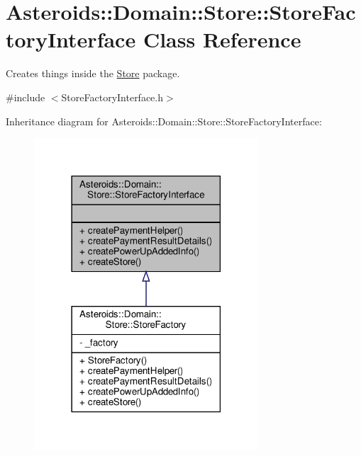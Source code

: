 \hypertarget{classAsteroids_1_1Domain_1_1Store_1_1StoreFactoryInterface}{}\section{Asteroids\+:\+:Domain\+:\+:Store\+:\+:Store\+Factory\+Interface Class Reference}
\label{classAsteroids_1_1Domain_1_1Store_1_1StoreFactoryInterface}


Creates things inside the \hyperlink{classAsteroids_1_1Domain_1_1Store_1_1Store}{Store} package.  




{\ttfamily \#include $<$Store\+Factory\+Interface.\+h$>$}



Inheritance diagram for Asteroids\+:\+:Domain\+:\+:Store\+:\+:Store\+Factory\+Interface\+:\nopagebreak
\begin{figure}[H]
\begin{center}
\leavevmode
\includegraphics[width=237pt]{classAsteroids_1_1Domain_1_1Store_1_1StoreFactoryInterface__inherit__graph}
\end{center}
\end{figure}


